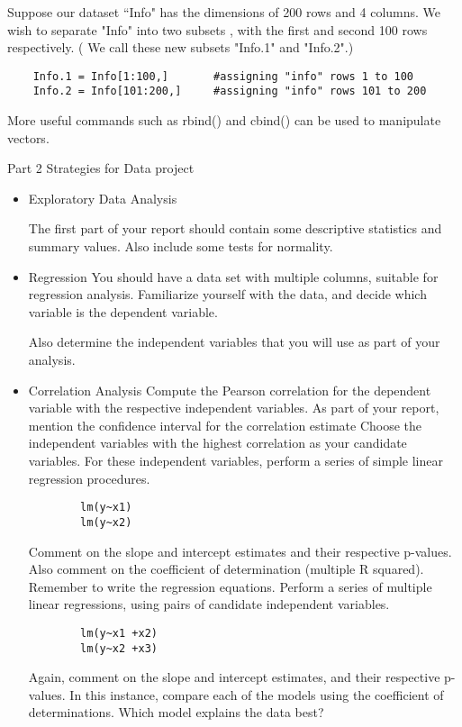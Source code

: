 \documentclass[a4paper,12pt]{article}
\begin{document}
\begin{itemize}
	Suppose our dataset ``Info" has the dimensions of 200 rows and 4 columns. We wish to separate "Info" into two subsets , with the first and second 100 rows respectively. ( We call these new subsets "Info.1" and "Info.2".)
	\begin{verbatim}
	Info.1 = Info[1:100,]		#assigning "info" rows 1 to 100
	Info.2 = Info[101:200,]		#assigning "info" rows 101 to 200
	\end{verbatim}
	
	More useful commands such as rbind() and cbind()  can be used to manipulate vectors.
	
	Part 2 Strategies for Data project
	\begin{itemize}
		\item Exploratory Data Analysis
		
		The first part of your report should contain some descriptive statistics and summary values. Also include some tests for normality.
		
		\item{Regression}
		You should have a data set with multiple columns, suitable for regression analysis.
		Familiarize yourself with the data, and decide which variable is the dependent variable.
		
		Also determine the independent variables that you will use as part of your analysis.
		
		\item{Correlation Analysis}
		Compute the Pearson correlation for the dependent variable with the respective independent variables.  As part of your report, mention the confidence interval for the correlation estimate
		Choose the independent variables with the highest correlation as your candidate variables.
		For these independent variables, perform a series of simple linear regression procedures.
		\begin{verbatim}
		lm(y~x1)
		lm(y~x2)
		\end{verbatim}
		Comment on the slope and intercept estimates and their respective p-values. Also comment on the coefficient of determination (multiple R squared). Remember to write the regression equations.
		Perform a series of multiple linear regressions, using pairs of candidate independent variables.
		\begin{verbatim}
		lm(y~x1 +x2)
		lm(y~x2 +x3)
		\end{verbatim}
		Again, comment on the slope and intercept estimates, and their respective p-values.
		In this instance, compare each of the models using the coefficient of determinations. Which model explains the data best?

\end{itemize}
\end{itemize}
\end{document}
